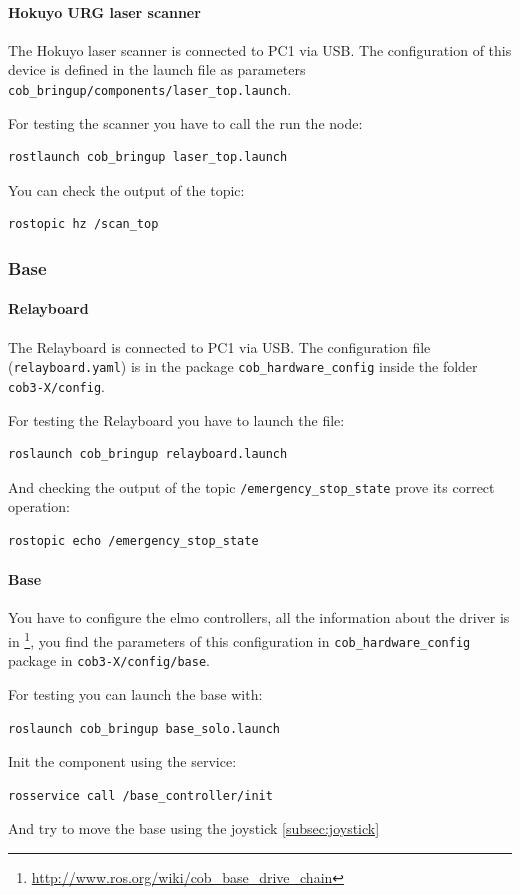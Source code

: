 \paragraph{Hokuyo URG laser scanner}
The Hokuyo laser scanner is connected to PC1 via USB. The configuration of this device is defined in the launch file as parameters \texttt{cob\_bringup/components/laser\_top.launch}.

For testing the scanner you have to call the run the node:
\begin{lstlisting}
rostlaunch cob_bringup laser_top.launch
\end{lstlisting}

You can check the output of the topic:
\begin{lstlisting}
rostopic hz /scan_top
\end{lstlisting}

\subsubsection{Base}

\paragraph{Relayboard}
The Relayboard is connected to PC1 via USB. The configuration file (\texttt{relayboard.yaml}) is in the package \texttt{cob\_hardware\_config} inside the folder \texttt{cob3-X/config}.

For testing the Relayboard you have to launch the file:
\begin{lstlisting}
roslaunch cob_bringup relayboard.launch
\end{lstlisting}

And checking the output of the topic \texttt{/emergency\_stop\_state} prove its correct operation:
\begin{lstlisting}
rostopic echo /emergency_stop_state
\end{lstlisting}

\paragraph{Base}
You have to configure the elmo controllers, all the information about the driver is in \footnote{\url{http://www.ros.org/wiki/cob_base_drive_chain}}, you find the parameters of this configuration in \texttt{cob\_hardware\_config} package in \texttt{cob3-X/config/base}.

For testing you can launch the base with:
\begin{lstlisting}
roslaunch cob_bringup base_solo.launch
\end{lstlisting}
Init the component using the service:
\begin{lstlisting}
rosservice call /base_controller/init
\end{lstlisting}
And try to move the base using the joystick \ref{subsec:joystick}

